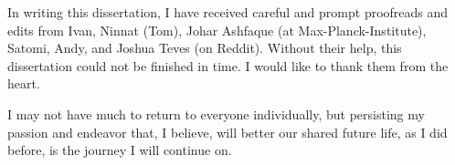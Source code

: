 \begin{acknowledgments}
In writing this dissertation, I have received careful and prompt proofreads and edits from Ivan, Ninnat (Tom), Johar Ashfaque (at Max-Planck-Institute), Satomi, Andy, and Joshua Teves (on Reddit).
Without their help, this dissertation could not be finished in time. I would like to thank them from the heart.

I may not have much to return to everyone individually, but persisting my passion and endeavor that, I believe, will better our shared future life, as I did before, is the journey I will continue on.
\end{acknowledgments} 
